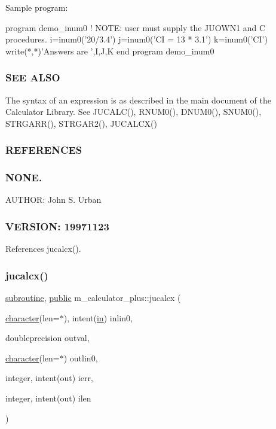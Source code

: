 \begin{DoxyVerb}Sample program:

   program demo_inum0
   ! NOTE: user must supply the JUOWN1 and C procedures.
   i=inum0('20/3.4')
   j=inum0('CI = 13 * 3.1')
   k=inum0('CI')
   write(*,*)'Answers are ',I,J,K
   end program demo_inum0
\end{DoxyVerb}


\subsubsection*{S\+EE A\+L\+SO}

The syntax of an expression is as described in the main document of the Calculator Library. See J\+U\+C\+A\+L\+C(), R\+N\+U\+M0(), D\+N\+U\+M0(), S\+N\+U\+M0(), S\+T\+R\+G\+A\+R\+R(), S\+T\+R\+G\+A\+R2(), J\+U\+C\+A\+L\+C\+X() \subsubsection*{R\+E\+F\+E\+R\+E\+N\+C\+ES}

\subsubsection*{N\+O\+NE.}

A\+U\+T\+H\+OR\+: John S. Urban \subsubsection*{V\+E\+R\+S\+I\+ON\+: 19971123}

References jucalcx().

\mbox{\label{namespacem__calculator__plus_a558a3fed7079c10085ce2f71da532d08}} 
\subsubsection{\texorpdfstring{jucalcx()}{jucalcx()}}
{\footnotesize\ttfamily \hyperlink{M__stopwatch_83_8txt_acfbcff50169d691ff02d4a123ed70482}{subroutine}, \hyperlink{M__stopwatch_83_8txt_a2f74811300c361e53b430611a7d1769f}{public} m\+\_\+calculator\+\_\+plus\+::jucalcx (\begin{DoxyParamCaption}\item[{\hyperlink{option__stopwatch_83_8txt_abd4b21fbbd175834027b5224bfe97e66}{character}(len=$\ast$), intent(\hyperlink{M__journal_83_8txt_afce72651d1eed785a2132bee863b2f38}{in})}]{inlin0,  }\item[{doubleprecision}]{outval,  }\item[{\hyperlink{option__stopwatch_83_8txt_abd4b21fbbd175834027b5224bfe97e66}{character}(len=$\ast$)}]{outlin0,  }\item[{integer, intent(out)}]{ierr,  }\item[{integer, intent(out)}]{ilen }\end{DoxyParamCaption})}



